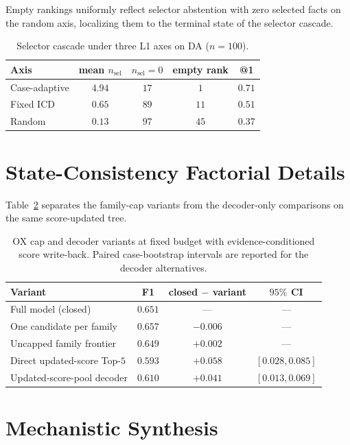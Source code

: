 \documentclass[letterpaper]{article}
\begin{document}
Empty rankings uniformly reflect selector abstention with zero selected facts on the random axis, localizing them to the terminal state of the selector cascade.

\begin{table}[tb]
\centering
\small
\begin{tabular}{@{}lcccc@{}}
\toprule
Axis & mean $n_{\mathrm{sel}}$ & $n_{\mathrm{sel}}{=}0$ & empty rank & @1 \\
\midrule
Case-adaptive & $4.94$ & $17$ & $1$ & $0.71$ \\
Fixed ICD & $0.65$ & $89$ & $11$ & $0.51$ \\
Random & $0.13$ & $97$ & $45$ & $0.37$ \\
\bottomrule
\end{tabular}
\caption{Selector cascade under three L1 axes on DA ($n{=}100$).}
\label{tab:org-cascade}
\end{table}

\section{State-Consistency Factorial Details}

Table~\ref{tab:state-detail} separates the family-cap variants from the decoder-only comparisons on the same score-updated tree.

\begin{table}[tb]
\centering
\small
\begin{tabular}{@{}p{2.35cm}ccc@{}}
\toprule
Variant & F1 & closed $-$ variant & $95\%$ CI \\
\midrule
Full model (closed) & $0.651$ & --- & --- \\
One candidate per family & $0.657$ & $-0.006$ & --- \\
Uncapped family frontier & $0.649$ & $+0.002$ & --- \\
Direct updated-score Top-$5$ & $0.593$ & $+0.058$ & $[0.028,0.085]$ \\
Updated-score-pool decoder & $0.610$ & $+0.041$ & $[0.013,0.069]$ \\
\bottomrule
\end{tabular}
\caption{OX cap and decoder variants at fixed budget with evidence-conditioned score write-back. Paired case-bootstrap intervals are reported for the decoder alternatives.}
\label{tab:state-detail}
\end{table}

\section{Mechanistic Synthesis}
\end{document}

